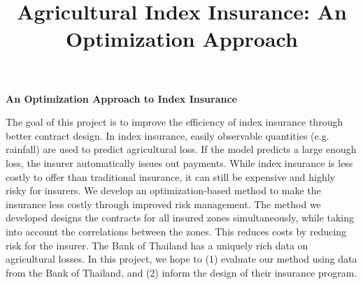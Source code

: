 \documentclass[12pt]{article}
\title{Agricultural Index Insurance: An Optimization Approach}
\date{}
\renewenvironment{abstract}
 {
  \begin{center}
  \bfseries An Optimization Approach to Index Insurance \vspace{-.5em}\vspace{0pt}
  \end{center}
  \list{}{
    \setlength{\leftmargin}{0mm}%
    \setlength{\rightmargin}{\leftmargin}%
  }%
  \item\relax}
 {\endlist}
\begin{document}
\begin{abstract}
  The goal of this project is to improve the efficiency of index insurance through better contract design. In index insurance, easily observable quantities (e.g. rainfall) are used to predict agricultural loss. If the model predicts a large enough loss, the insurer automatically issues out payments. While index insurance is less costly to offer than traditional insurance, it can still be expensive and highly risky for insurers. We develop an optimization-based method to make the insurance less costly through improved risk management. The method we developed designs the contracts for all insured zones simultaneously, while taking into account the correlations between the zones. This reduces costs by reducing risk for the insurer. The Bank of Thailand has a uniquely rich data on agricultural losses. In this project, we hope to (1) evaluate our method using data from the Bank of Thailand, and (2) inform the design of their insurance program. 
\end{abstract}
\end{document}
